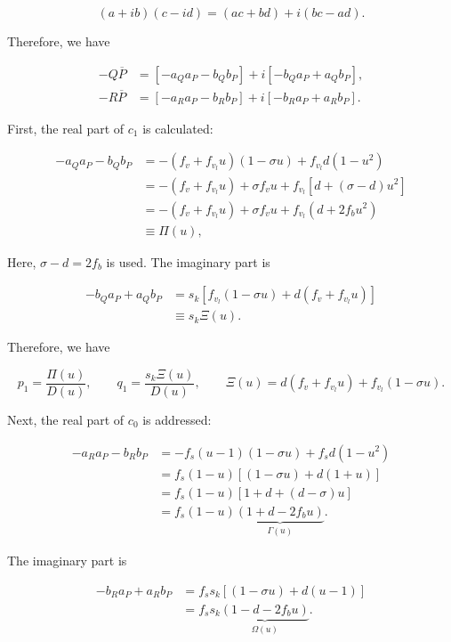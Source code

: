 \documentclass[11pt,a4paper,openany]{book}
\numberwithin{equation}{chapter}
\numberwithin{figure}{chapter}
\numberwithin{table}{chapter}
\begin{document}
\begin{equation}
(a+ib)(c-id)=(ac+bd)+i(bc-ad).
\end{equation}

Therefore, we have

\begin{align}
-Q\overline P
&=\left[-a_Qa_P-b_Qb_P\right]
+i\left[-b_Qa_P+a_Qb_P\right],\\
-R\overline P
&=\left[-a_Ra_P-b_Rb_P\right]
+i\left[-b_Ra_P+a_Rb_P\right].
\end{align}




First, the real part of $c_1$ is calculated:

\begin{align}
-a_Qa_P-b_Qb_P
&=-\left(f_v+f_{v_l}u\right)(1-\sigma u)+f_{v_l}d(1-u^2)\\
&=-\left(f_v+f_{v_l}u\right)+\sigma f_vu
+f_{v_l}\left[d+(\sigma-d)u^2\right]\\
&=-\left(f_v+f_{v_l}u\right)+\sigma f_vu
+f_{v_l}\left(d+2f_bu^2\right)\\
&\equiv\Pi(u),
\end{align}

Here, $\sigma-d=2f_b$ is used. The imaginary part is

\begin{align}
-b_Qa_P+a_Qb_P
&=s_k\left[f_{v_l}(1-\sigma u)+d(f_v+f_{v_l}u)\right]\\
&\equiv s_k\Xi(u).
\end{align}

Therefore, we have

\begin{equation}
p_1=\frac{\Pi(u)}{D(u)},
\qquad
q_1=\frac{s_k\Xi(u)}{D(u)},
\qquad
\Xi(u)=d(f_v+f_{v_l}u)+f_{v_l}(1-\sigma u).
\label{eq:p1q1-full}
\end{equation}




Next, the real part of $c_0$ is addressed:

\begin{align}
-a_Ra_P-b_Rb_P
&=-f_s(u-1)(1-\sigma u)+f_sd(1-u^2)\\
&=f_s(1-u)\left[(1-\sigma u)+d(1+u)\right]\\
&=f_s(1-u)\left[1+d+(d-\sigma)u\right]\\
&=f_s(1-u)\underbrace{(1+d-2f_bu)}_{\Gamma(u)}.
\end{align}

The imaginary part is

\begin{align}
-b_Ra_P+a_Rb_P
&=f_ss_k\left[(1-\sigma u)+d(u-1)\right]\\
&=f_ss_k\underbrace{(1-d-2f_bu)}_{\Omega(u)}.
\end{align}
\end{document}

